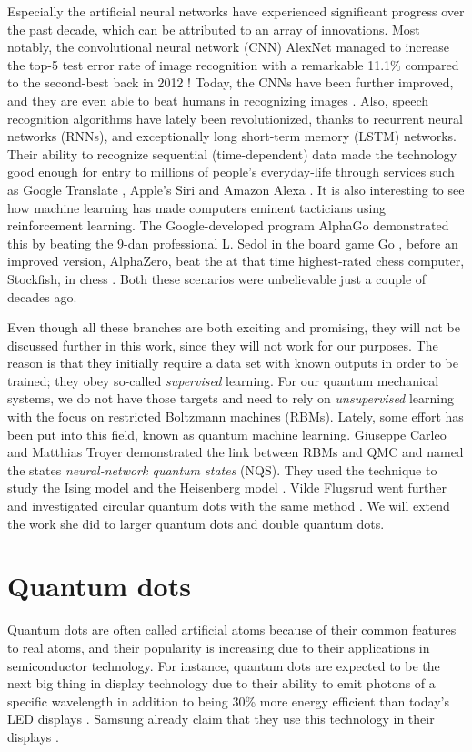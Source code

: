 Especially the artificial neural networks have experienced significant progress over the past decade, which can be attributed to an array of innovations. Most notably, the convolutional neural network (CNN) AlexNet managed to increase the top-5 test error rate of image recognition with a remarkable 11.1\% compared to the second-best back in 2012 \cite{krizhevsky_imagenet_2012}! Today, the CNNs have been further improved, and they are even able to beat humans in recognizing images \cite{alom_history_2018}. Also, speech recognition algorithms have lately been revolutionized, thanks to recurrent neural networks (RNNs), and exceptionally long short-term memory (LSTM) networks. Their ability to recognize sequential (time-dependent) data made the technology good enough for entry to millions of people's everyday-life through services such as Google Translate \cite{wu_googles_2016}, Apple's Siri \cite{smith_ios_2016} and Amazon Alexa \cite{noauthor_bringing_nodate}. It is also interesting to see how machine learning has made computers eminent tacticians using reinforcement learning. The Google-developed program AlphaGo demonstrated this by beating the 9-dan professional L. Sedol in the board game Go \cite{noauthor_alphago_nodate}, before an improved version, AlphaZero, beat the at that time highest-rated chess computer, Stockfish, in chess \cite{klein_mikeklein_googles_nodate}. Both these scenarios were unbelievable just a couple of decades ago.

Even though all these branches are both exciting and promising, they will not be discussed further in this work, since they will not work for our purposes. The reason is that they initially require a data set with known outputs in order to be trained; they obey so-called \textit{supervised} learning. For our quantum mechanical systems, we do not have those targets and need to rely on \textit{unsupervised} learning with the focus on restricted Boltzmann machines (RBMs). Lately, some effort has been put into this field, known as quantum machine learning. Giuseppe Carleo and Matthias Troyer demonstrated the link between RBMs and QMC and named the states \textit{neural-network quantum states} (NQS). They used the technique to study the Ising model and the Heisenberg model \cite{carleo_solving_2017}. Vilde Flugsrud went further and investigated circular quantum dots with the same method \cite{flugsrud_vilde_moe_solving_nodate}. We will extend the work she did to larger quantum dots and double quantum dots.

\section{Quantum dots}
Quantum dots are often called artificial atoms because of their common features to real atoms, and their popularity is increasing due to their applications in semiconductor technology. For instance, quantum dots are expected to be the next big thing in display technology due to their ability to emit photons of a specific wavelength in addition to being 30\% more energy efficient than today's LED displays \cite{manders_8.3:_2015}. Samsung already claim that they use this technology in their displays \cite{noauthor_2019_nodate}.

